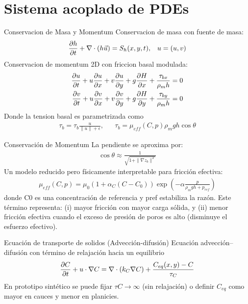 \documentclass{beamer}
\begin{document}
\section[Sistema PDEs]{Sistema acoplado de PDEs}
\begin{frame}{Conservacion de Masa y Momentum}
    Conservacion de masa con fuente de masa: 
    \begin{align}
    {\partial h \over \partial t} + \nabla \cdot (h \vec{u}) = S_h(x,y,t), && u=(u,v)
    \end{align}
    Conservacion de momentum 2D con friccion basal modulada:
    \begin{align}
    {{\partial u} \over{\partial t}}+u{{\partial u} \over{\partial x}}+v{{\partial u} \over{\partial y}}+g{{\partial H} \over{\partial x}}+{{\tau_{bx}} \over{\rho_mh}} = 0 \\
    {{\partial v} \over{\partial t}}+u{{\partial v} \over{\partial x}}+v{{\partial v} \over{\partial y}}+g{{\partial H} \over{\partial y}}+{{\tau_{by}} \over{\rho_mh}} = 0
    \end{align}
    Donde la tension basal es parametrizada como 
    \begin{align}
    \tau_{b} = \tau_{b}\frac{u}{\|u\|+\epsilon},&&\tau_{b}=\mu_{eff}(C,p)\rho_mgh \cos\theta
    \end{align}
\end{frame}

\begin{frame}{Conservación de Momentum}
    La pendiente se aproxima por:
    \begin{align}
        \cos\theta\approx \frac{1}{\sqrt{1+\|\nabla z_b\|^2}}
    \end{align}
    Un modelo reducido pero físicamente interpretable para fricción efectiva:
    \begin{align}
        \mu_{eff}(C,p) = \mu_0(1+\alpha_C(C-C_0))\exp(-\alpha \frac{p}{\rho_mgh+p_{ref}})
    \end{align}
    donde C0 es una concentración de referencia y pref estabiliza la razón. Este término representa: (i) mayor fricción con mayor carga sólida, y 
    (ii) menor fricción efectiva cuando el exceso de presión de poros es alto (disminuye el esfuerzo efectivo).

\end{frame}

\begin{frame}{Ecuación de transporte de solidos (Advección-difusión)}
    Ecuación advección–difusión con término de relajación hacia un equilibrio
    \begin{align}
    {\partial C \over \partial t} + u\cdot \nabla C = \nabla \cdot (k_C\nabla C) + \frac{C_{eq}(x,y)-C}{\tau_C}
    \end{align}
    En prototipo sintético se puede fijar $\tau C \rightarrow \infty$ (sin relajación) o definir $C_{eq}$ como mayor en cauces y menor en planicies.
\end{frame}
\end{document}
